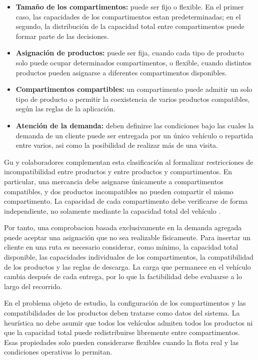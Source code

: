 \begin{itemize}
    \item \textbf{Tamaño de los compartimentos:} puede ser fijo o flexible. En el primer caso, las capacidades de los compartimentos estan predeterminadas; en el segundo, la distribución de la capacidad total entre compartimentos puede formar parte de las decisiones.
    \item \textbf{Asignación de productos:} puede ser fija, cuando cada tipo de producto solo puede ocupar determinados compartimentos, o flexible, cuando distintos productos pueden asignarse a diferentes compartimentos disponibles.
    \item \textbf{Compartimentos compartibles:} un compartimento puede admitir un solo tipo de producto o permitir la coexistencia de varios productos compatibles, según las reglas de la aplicación.
    \item \textbf{Atención de la demanda:} deben definirse las condiciones bajo las cuales la demanda de un cliente puede ser entregada por un único vehículo o repartida entre varios, asi como la posibilidad de realizar más de una visita.
\end{itemize}

Gu y colaboradores complementan esta clasificación al formalizar restricciones de incompatibilidad entre productos y entre productos y compartimentos. En particular, una mercancia debe asignarse únicamente a compartimentos compatibles, y dos productos incompatibles no pueden compartir el mismo compartimento. La capacidad de cada compartimento debe verificarse de forma independiente, no solamente mediante la capacidad total del vehículo \cite{gu2024}.

Por tanto, una comprobacion basada exclusivamente en la demanda agregada puede aceptar una asignación que no sea realizable físicamente. Para insertar un cliente en una ruta es necesario considerar, como mínimo, la capacidad total disponible, las capacidades individuales de los compartimentos, la compatibilidad de los productos y las reglas de descarga. La carga que permanece en el vehículo cambia después de cada entrega, por lo que la factibilidad debe evaluarse a lo largo del recorrido.

En el problema objeto de estudio, la configuración de los compartimentos y las compatibilidades de los productos deben tratarse como datos del sistema. La heurística no debe asumir que todos los vehículos admiten todos los productos ni que la capacidad total puede redistribuirse libremente entre compartimentos. Esas propiedades solo pueden considerarse flexibles cuando la flota real y las condiciones operativas lo permitan.

